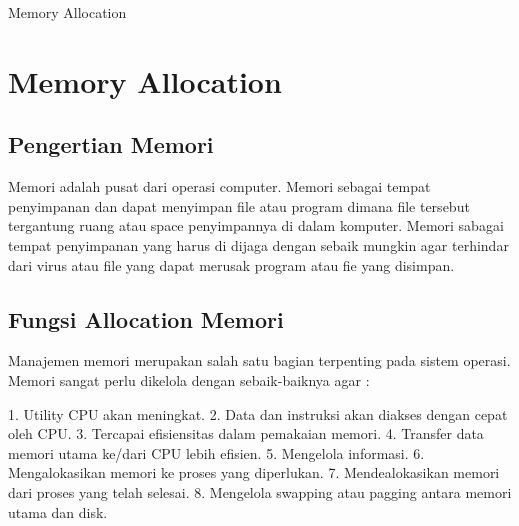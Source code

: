 
Memory Allocation

\section {Memory Allocation}

\subsection {Pengertian Memori}

Memori adalah pusat dari operasi computer. Memori sebagai tempat penyimpanan dan dapat menyimpan file atau program dimana file tersebut tergantung ruang atau space penyimpannya di dalam komputer. Memori sabagai tempat penyimpanan yang harus di dijaga dengan sebaik mungkin agar terhindar dari virus atau file yang dapat merusak program atau fie yang disimpan.

\subsection {Fungsi Allocation Memori}


Manajemen memori merupakan salah satu bagian terpenting pada sistem operasi. Memori sangat perlu dikelola dengan sebaik-baiknya agar :

1.	Utility CPU akan meningkat.
2.	Data dan instruksi akan diakses dengan cepat oleh CPU.
3.	Tercapai efisiensitas dalam pemakaian memori.
4.	Transfer data memori utama ke/dari CPU lebih efisien.
5.	Mengelola informasi. 
6.	Mengalokasikan memori ke proses yang diperlukan. 
7.	Mendealokasikan memori dari proses yang telah selesai. 
8.	Mengelola swapping atau pagging antara memori utama dan disk.


